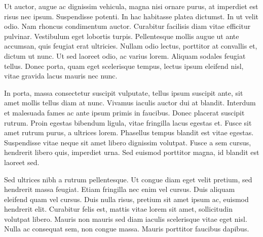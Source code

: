 Ut auctor, augue ac dignissim vehicula, magna nisi ornare purus, at imperdiet est risus nec ipsum. Suspendisse potenti. In hac habitasse platea dictumst. In ut velit odio. Nam rhoncus condimentum auctor. Curabitur facilisis diam vitae efficitur pulvinar. Vestibulum eget lobortis turpis. Pellentesque mollis augue ut ante accumsan, quis feugiat erat ultricies. Nullam odio lectus, porttitor at convallis et, dictum ut nunc. Ut sed laoreet odio, ac varius lorem. Aliquam sodales feugiat tellus. Donec porta, quam eget scelerisque tempus, lectus ipsum eleifend nisl, vitae gravida lacus mauris nec nunc.

In porta, massa consectetur suscipit vulputate, tellus ipsum suscipit ante, sit amet mollis tellus diam at nunc. Vivamus iaculis auctor dui at blandit. Interdum et malesuada fames ac ante ipsum primis in faucibus. Donec placerat suscipit rutrum. Proin egestas bibendum ligula, vitae fringilla lacus egestas et. Fusce sit amet rutrum purus, a ultrices lorem. Phasellus tempus blandit est vitae egestas. Suspendisse vitae neque sit amet libero dignissim volutpat. Fusce a sem cursus, hendrerit libero quis, imperdiet urna. Sed euismod porttitor magna, id blandit est laoreet sed.

Sed ultrices nibh a rutrum pellentesque. Ut congue diam eget velit pretium, sed hendrerit massa feugiat. Etiam fringilla nec enim vel cursus. Duis aliquam eleifend quam vel cursus. Duis nulla risus, pretium sit amet ipsum ac, euismod hendrerit elit. Curabitur felis est, mattis vitae lorem sit amet, sollicitudin volutpat libero. Mauris non mauris sed diam iaculis scelerisque vitae eget nisl. Nulla ac consequat sem, non congue massa. Mauris porttitor faucibus dapibus.
